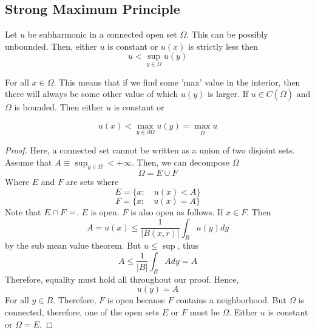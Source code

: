 \documentclass{article}
\newtheorem{one minute paper}[theorem]{One Minute Paper}
\begin{document}
\subsection*{Strong Maximum Principle}

Let $u$ be subharmonic in a connected open set $\Omega$. This can be possibly unbounded. Then, either $u$ is constant or $u(x)$ is strictly less then 
\begin{equation}
    u < \sup_{y \in \Omega}u(y)
\end{equation}

For all $x \in \Omega$. This means that if we find some 'max' value in the interior, then there will always be some other value of which $u(y)$ is larger. If $u \in C(\overline{\Omega})$ and $\Omega$ is bounded. Then either $u$ is constant or 

\begin{equation}
    u(x) < \max_{y \in \partial \Omega}u(y) = \max_{\overline{\Omega}}u
\end{equation}

\begin{proof}
    Here, a connected set cannot be written as a union of two disjoint sets. Assume that $A \equiv \sup_{y \in \Omega} < +\infty$. Then, we can decompose $\Omega$
    \begin{equation}
        \Omega = E \cup F
    \end{equation}  
    Where $E$ and $F$ are sets where 
    \begin{equation}
        E = \{x: \quad u(x) < A\}
    \end{equation}
    \begin{equation}
        F = \{x: \quad u(x) = A\}
    \end{equation}
    Note that $E \cap F = \empty$. $E$ is open. $F$ is also open as follows. If $x \in F$. Then $$A = u(x) \leq \frac{1}{|B(x,r)|}\int_{B}u(y)dy$$ by the sub mean value theorem. But $u \leq \sup$, thus 
    \begin{equation}
        A \leq \frac{1}{|B|}\int_{B}A dy = A
    \end{equation}
    Therefore, equality must hold all throughout our proof. Hence, 
    \begin{equation}
        u(y) = A
    \end{equation}
    For all $y \in B$. Therefore, $F$ is open because $F$ contains a neighborhood. But $\Omega$ is connected, therefore, one of the open sets $E$ or $F$ must be $\Omega$. Either $u$ is constant or $\Omega = E$. 
\end{proof}
\end{document}
